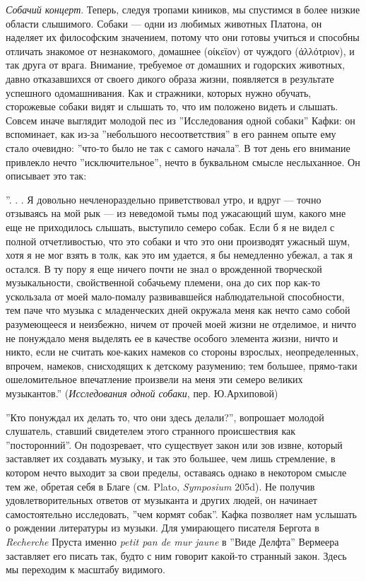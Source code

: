 \documentclass[12pt]{book}
\begin{document}
\textit{Собачий концерт}. Теперь, следуя тропами киников, мы спустимся в более низкие области слышимого. Собаки --- одни из любимых животных Платона, он наделяет их философским значением, потому что они готовы учиться и способны отличать знакомое от незнакомого, домашнее (οίκεϊον) от чуждого (άλλότριον), и так друга от врага. Внимание, требуемое от домашних и годорских животных, давно отказавшихся от своего дикого образа жизни, появляется в результате успешного одомашнивания. Как и стражники, которых нужно обучать, сторожевые собаки видят и слышать то, что им положено видеть и слышать. Совсем иначе выглядит молодой пес из ''Исследования одной собаки'' Кафки: он вспоминает, как из-за ''небольшого несоответствия'' в его раннем опыте ему стало очевидно: ''что-то было не так с самого начала''. В тот день его внимание привлекло нечто ''исключительное'', нечто в буквальном смысле неслыханное. Он описывает это так:

\smallskip
{}\relax
{}\relax

''. . . Я довольно нечленораздельно приветствовал утро, и вдруг --- точно отзываясь на мой рык --- из неведомой тьмы под ужасающий шум, какого мне еще не приходилось слышать, выступило семеро собак. Если б я не видел с полной отчетливостью, что это собаки и что это они производят ужасный шум, хотя я не мог взять в толк, как это им удается, я бы немедленно убежал, а так я остался. В ту пору я еще ничего почти не знал о врожденной творческой музыкальности, свойственной собачьему племени, она до сих пор как-то ускользала от моей мало-помалу развивавшейся наблюдательной способности, тем паче что музыка с младенческих дней окружала меня как нечто само собой разумеющееся и неизбежно, ничем от прочей моей жизни не отделимое, и ничто не понуждало меня выделять ее в качестве особого элемента жизни, ничто и никто, если не считать кое-каких намеков со стороны взрослых, неопределенных, впрочем, намеков, снисходящих к детскому разумению; тем большее, прямо-таки ошеломительное впечатление произвели на меня эти семеро великих музыкантов.'' (\textit{Исследования одной собаки}, пер. Ю.Архиповой)

\relax
{}\relax
\smallskip

''Кто понуждал их делать то, что они здесь делали?'', вопрошает молодой слушатель, ставший свидетелем этого странного происшествия как ''посторонний''. Он подозревает, что существует закон или зов извне, который заставляет их создавать музыку, и так это большее, чем лишь стремление, в котором нечто выходит за свои пределы, оставаясь однако в некотором смысле тем же, обретая себя в Благе (см. Plato, \textit{Symposium} 205d). Не получив удовлетворительных ответов от музыканта и других людей, он начинает самостоятельно исследовать, ''чем кормят собак''. Кафка позволяет нам услышать о рождении литературы из музыки. Для умирающего писателя Бергота в \textit{Recherche} Пруста именно \textit{petit pan de mur jaune} в ''Виде Делфта'' Вермеера заставляет его писать так, будто с ним говорит какой-то странный закон. Здесь мы переходим к масштабу видимого.
\end{document}

